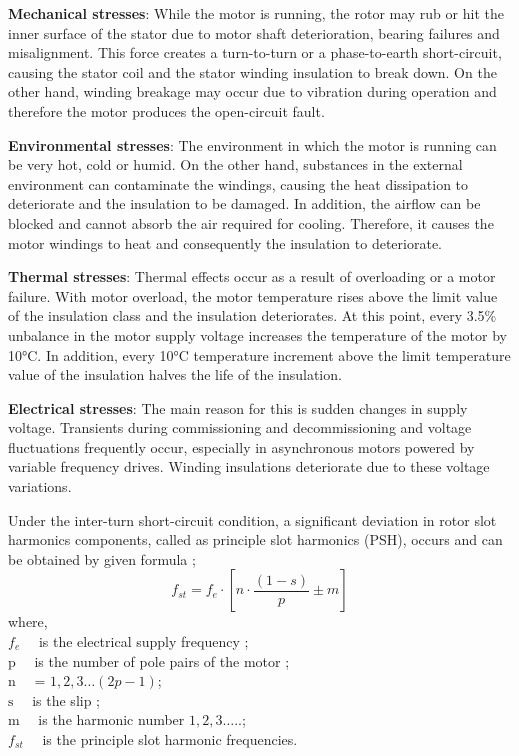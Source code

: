 \textbf{Mechanical stresses}: While the motor is running, the rotor may rub or hit the inner surface of the stator due to motor shaft deterioration, bearing failures and misalignment. This force creates a turn-to-turn or a phase-to-earth short-circuit, causing the stator coil and the stator winding insulation to break down. On the other hand, winding breakage may occur due to vibration during operation and therefore the motor produces the open-circuit fault.

\textbf{Environmental stresses}: The environment in which the motor is running can be very hot, cold or humid. On the other hand, substances in the external environment can contaminate the windings, causing the heat dissipation to deteriorate and the insulation to be damaged. In addition, the airflow can be blocked and cannot absorb the air required for cooling. Therefore, it causes the motor windings to heat and consequently the insulation to deteriorate.

\textbf{Thermal stresses}: Thermal effects occur as a result of overloading or a motor failure. With motor overload, the motor temperature rises above the limit value of the insulation class and the insulation deteriorates. At this point, every 3.5\% unbalance in the motor supply voltage increases the temperature of the motor by 10°C. In addition, every 10°C temperature increment above the limit temperature value of the insulation halves the life of the insulation.

\textbf{Electrical stresses}: The main reason for this is sudden changes in supply voltage. Transients during commissioning and decommissioning and voltage fluctuations frequently occur, especially in asynchronous motors powered by variable frequency drives. Winding insulations deteriorate due to these voltage variations.

Under the inter-turn short-circuit condition, a significant deviation in rotor slot harmonics components, called as principle slot harmonics (PSH), occurs and can be obtained by given formula \cite{Penman};
\begin{equation}
	f_{st}=f_{e} \cdot\left[n \cdot \frac{(1-s)}{p} \pm m\right]
	\label{statorfault}
\end{equation}
where,\\
$f_{e} \quad$ is the electrical supply frequency ;\\
$\mathrm{p} \quad$ is the number of pole pairs of the motor ;\\
$\mathrm{n} \quad$ = $1,2,3 \ldots (2p-1)$;\\
$\mathrm{s} \quad$ is the slip ;\\
$\mathrm{m} \quad$ is the harmonic number $1,2,3 \ldots$..;\\
$f_{st} \quad$ is the principle slot harmonic frequencies.

